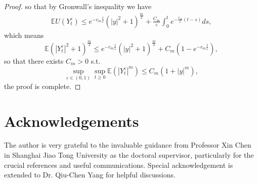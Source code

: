 \documentclass[11pt,reqno]{amsart}
\numberwithin{equation}{section}
\begin{document}
\begin{proof}
so that by Gronwall's inequality we have 
\begin{align*}
	\mathbb{E}U(Y_{t}^{\varepsilon})\leq e^{-c_{m}\frac{t}{\varepsilon}}(|y|^{2}+1)^{\frac{m}{2}}+\frac{C_{m}}{\varepsilon} \int^{t}_{0}e^{-\frac{c_{m}}{\varepsilon}(t-s)}ds,
\end{align*}
which means
$$\mathbb{E}(|Y_{t}^{\varepsilon}|^{2}+1)^{\frac{m}{2}}\leq e^{-c_{m}\frac{t}{\varepsilon}}(|y|^{2}+1)^{\frac{m}{2}}+C_{m}(1-e^{-c_{m}\frac{t}{\varepsilon}}),$$
so that there exists $C_{m}>0$ s.t.
\begin{equation*}
	\sup\limits_{\varepsilon\in (0,1)}\sup\limits_{t\geq0} \mathbb{E}\left(|Y_{t}^{\varepsilon}|^{m}\right)\leq C_{m}(1+|y|^{m}),
\end{equation*}
the proof is complete.
\end{proof}























\section*{Acknowledgements}
The author is very grateful to the invaluable guidance from Professor Xin Chen in Shanghai Jiao Tong University as the doctoral supervisor, particularly for  the crucial references and useful communications. Special acknowledgement is extended to Dr. Qiu-Chen Yang for helpful discussions.
\end{document}
